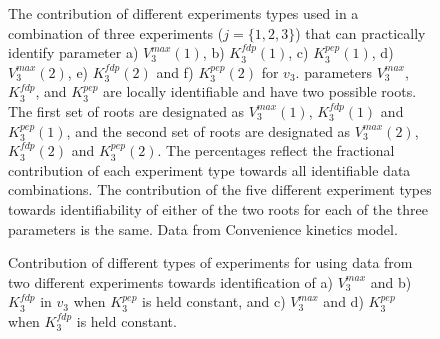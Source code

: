 \documentclass[10pt]{article}
\begin{document}
\begin{figure}[!tbhp]
	\caption{The contribution of different experiments types used in a combination of three experiments ($j = \{1, 2, 3\}$) that can practically identify parameter a) $V_3^{max}(1)$, b) $K_3^{fdp}(1)$, c) $K_3^{pep}(1)$, d) $V_3^{max}(2)$, e) $K_3^{fdp}(2)$ and f) $K_3^{pep}(2)$ for $v_3$. parameters $V_3^{max}$, $K_3^{fdp}$, and $K_3^{pep}$ are locally identifiable and have two possible roots. The first set of roots are designated as $V_3^{max}(1)$, $K_3^{fdp}(1)$ and $K_3^{pep}(1)$, and the second set of roots are designated as $V_3^{max}(2)$, $K_3^{fdp}(2)$ and $K_3^{pep}(2)$. The percentages reflect the fractional contribution of each experiment type towards all identifiable data combinations. The contribution of the five different experiment types towards identifiability of either of the two roots for each of the three parameters is the same. Data from Convenience kinetics model.}
\end{figure} 	

\begin{figure}[!tbhp]
	\caption{Contribution of different types of experiments for using data from two different experiments towards identification of a) $V_3^{max}$ and b) $K_3^{fdp}$ in $v_3$ when $K_3^{pep}$ is held constant, and c) $V_3^{max}$ and d) $K_3^{pep}$ when $K_3^{fdp}$ is held constant.}%
\end{figure}	
\end{document}
